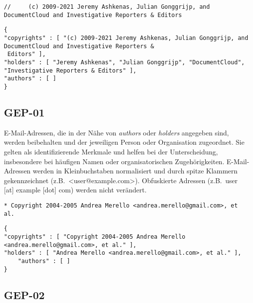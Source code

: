 \begin{lstlisting}[keepspaces=true]
//     (c) 2009-2021 Jeremy Ashkenas, Julian Gonggrijp, and DocumentCloud and Investigative Reporters & Editors
\end{lstlisting}

\begin{lstlisting}[keepspaces=true]
{
"copyrights" : [ "(c) 2009-2021 Jeremy Ashkenas, Julian Gonggrijp, and DocumentCloud and Investigative Reporters &
 Editors" ],
"holders" : [ "Jeremy Ashkenas", "Julian Gonggrijp", "DocumentCloud", "Investigative Reporters & Editors" ],
"authors" : [ ]
}
\end{lstlisting}


\subsection{GEP-01}\label{subsec:gep-01}

E-Mail-Adressen, die in der Nähe von \textit{authors} oder \textit{holders} angegeben sind, werden beibehalten und der jeweiligen Person oder Organisation zugeordnet.
Sie gelten als identifizierende Merkmale und helfen bei der Unterscheidung, insbesondere bei häufigen Namen oder organisatorischen Zugehörigkeiten.
E-Mail-Adressen werden in Kleinbuchstaben normalisiert und durch spitze Klammern gekennzeichnet (z.B.\ <user@example.com>).
Obfuskierte Adressen (z.B.\ user [at] example [dot] com) werden nicht verändert.

\begin{lstlisting}[keepspaces=true]
* Copyright 2004-2005 Andrea Merello <andrea.merello@gmail.com>, et al.
\end{lstlisting}

\begin{lstlisting}[keepspaces=true]
{
"copyrights" : [ "Copyright 2004-2005 Andrea Merello <andrea.merello@gmail.com>, et al." ],
"holders" : [ "Andrea Merello <andrea.merello@gmail.com>, et al." ],
    "authors" : [ ]
}
\end{lstlisting}


\subsection{GEP-02}\label{subsec:gep-02}

